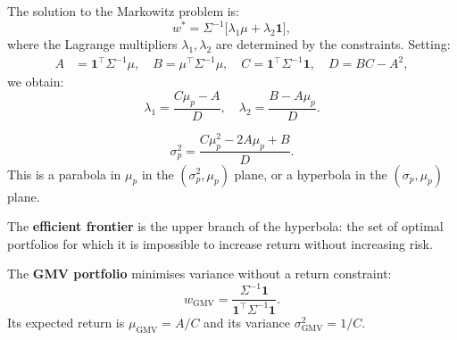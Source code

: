 \begin{theorem}
\label{thm:markowitz_solution}
The solution to the Markowitz problem is:
\[
    w^* = \Sigma^{-1}\bigl[\lambda_1\mu + \lambda_2\mathbf{1}\bigr],
\]
where the Lagrange multipliers $\lambda_1, \lambda_2$ are determined by
the constraints. Setting:
\begin{align}
    A &= \mathbf{1}^\top\Sigma^{-1}\mu, \quad
    B = \mu^\top\Sigma^{-1}\mu, \quad
    C = \mathbf{1}^\top\Sigma^{-1}\mathbf{1}, \quad
    D = BC - A^2,
\end{align}
we obtain:
\[
    \lambda_1 = \frac{C\mu_p - A}{D}, \quad
    \lambda_2 = \frac{B - A\mu_p}{D}.
\]
\end{theorem}

\begin{keyformulas}[title=\textbf{Minimum Variance of the Optimal Portfolio}]
\[
    \sigma_p^2 = \frac{C\mu_p^2 - 2A\mu_p + B}{D}.
\]
This is a parabola in $\mu_p$ in the $(\sigma_p^2, \mu_p)$ plane,
or a hyperbola in the $(\sigma_p, \mu_p)$ plane.
\end{keyformulas}

\begin{definition}
The \textbf{efficient frontier} is the upper branch of the hyperbola:
the set of optimal portfolios for which it is impossible to increase
return without increasing risk.
\end{definition}

\begin{definition}
The \textbf{GMV portfolio} minimises variance without a return constraint:
\[
    w_{\text{GMV}} = \frac{\Sigma^{-1}\mathbf{1}}
    {\mathbf{1}^\top\Sigma^{-1}\mathbf{1}}.
\]
Its expected return is $\mu_{\text{GMV}} = A/C$ and its variance
$\sigma_{\text{GMV}}^2 = 1/C$.
\end{definition}

